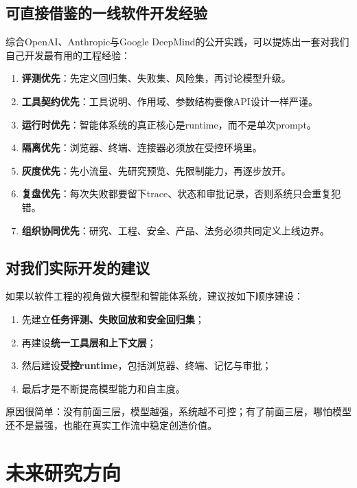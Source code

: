 \documentclass[12pt,a4paper]{article}
\begin{document}
\subsection{可直接借鉴的一线软件开发经验}

综合OpenAI、Anthropic与Google DeepMind的公开实践，可以提炼出一套对我们自己开发最有用的工程经验：

\begin{enumerate}
    \item \textbf{评测优先}：先定义回归集、失败集、风险集，再讨论模型升级。
    \item \textbf{工具契约优先}：工具说明、作用域、参数结构要像API设计一样严谨。
    \item \textbf{运行时优先}：智能体系统的真正核心是runtime，而不是单次prompt。
    \item \textbf{隔离优先}：浏览器、终端、连接器必须放在受控环境里。
    \item \textbf{灰度优先}：先小流量、先研究预览、先限制能力，再逐步放开。
    \item \textbf{复盘优先}：每次失败都要留下trace、状态和审批记录，否则系统只会重复犯错。
    \item \textbf{组织协同优先}：研究、工程、安全、产品、法务必须共同定义上线边界。
\end{enumerate}

\subsection{对我们实际开发的建议}

如果以软件工程的视角做大模型和智能体系统，建议按如下顺序建设：
\begin{enumerate}
    \item 先建立\textbf{任务评测、失败回放和安全回归集}；
    \item 再建设\textbf{统一工具层和上下文层}；
    \item 然后建设\textbf{受控runtime}，包括浏览器、终端、记忆与审批；
    \item 最后才是不断提高模型能力和自主度。
\end{enumerate}

原因很简单：没有前面三层，模型越强，系统越不可控；有了前面三层，哪怕模型还不是最强，也能在真实工作流中稳定创造价值。

\section{未来研究方向}
\end{document}
